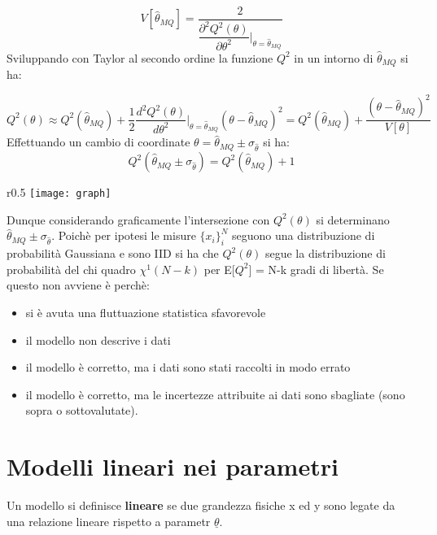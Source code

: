 \begin{equation}
	V[\hat{\theta}_{MQ}] = \dfrac{2}{\dfrac{\partial^2Q^2(\theta)}{\partial \theta^2} \Big \vert_{\theta = \hat{\theta}_{MQ}}}
\end{equation}
Sviluppando con Taylor al secondo ordine la funzione $Q^2$ in un intorno di $\hat{\theta}_{MQ}$ si ha:

\begin{equation*}
	Q^2(\theta) \approx Q^2(\hat{\theta}_{MQ}) + \dfrac{1}{2}\dfrac{d^2 Q^2(\theta)}{d\theta^2}\Big \vert_{\theta = \hat{\theta}_{MQ}}(\theta - \hat{\theta}_{MQ})^2 = Q^2(\hat{\theta}_{MQ}) + \dfrac{(\theta - \hat{\theta}_{MQ})^2}{V[\theta]}
\end{equation*}
Effettuando un cambio di coordinate $\theta = \hat{\theta}_{MQ} \pm \sigma_{\hat{\theta}}$ si ha:
\begin{equation*}
	Q^2(\hat{\theta}_{MQ} \pm \sigma_{\hat{\theta}}) = Q^2(\hat{\theta}_{MQ}) + 1
\end{equation*}
\begin{wrapfigure}[8]{r}{0.5 \textwidth}
\centering
\texttt{[image: graph]}	

\end{wrapfigure}
\newline
Dunque considerando graficamente l'intersezione con $Q^2(\theta)$ si determinano $\hat{\theta}_{MQ} \pm \sigma_{\hat{\theta}}$. Poich\`{e} per ipotesi le misure $\{x_i\}_i^N$ seguono una distribuzione di probabilit\`{a} Gaussiana e sono IID si ha che $Q^2(\theta)$ segue la distribuzione di probabilit\`{a} del chi quadro $\chi^1(N-k)$ per E[$Q^2$] = N-k gradi di libert\`{a}. Se questo non avviene \`{e} perch\`{e}:
\begin{itemize}
	\item si \`{e} avuta una fluttuazione statistica sfavorevole
	\item il modello non descrive i dati
	\item il modello \`{e} corretto, ma i dati sono stati raccolti in modo errato
	\item il modello \`{e} corretto, ma le incertezze attribuite ai dati sono sbagliate (sono sopra o sottovalutate).
\end{itemize}

\section{Modelli lineari nei parametri}

Un modello si definisce \textbf{lineare} se due grandezza fisiche x ed y sono legate da una relazione lineare rispetto a parametr $\underline{\theta}$.

